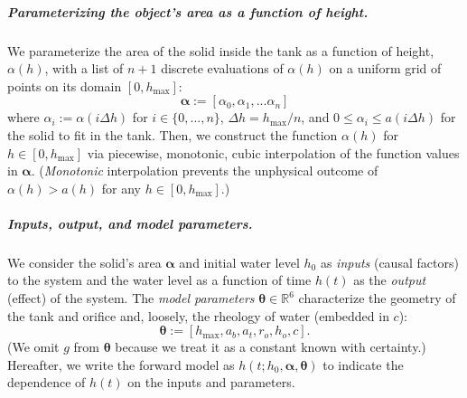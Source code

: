 \documentclass[openacc]{rsproca_new}%
\newcommand\themodel {$h(t; h_0, \boldsymbol \alpha, \boldsymbol\theta)$\xspace}
\begin{document}
\vspace{-\baselineskip}
\subparagraph{Parameterizing the object's area as a function of height.}
We parameterize the area of the solid inside the tank as a function of height, $\alpha(h)$, with a list of $n+1$ discrete evaluations of $\alpha(h)$ on a uniform grid of points on its domain $[0, h_{\text{max}}]$:
\begin{equation}
	\boldsymbol \alpha := [\alpha_0, \alpha_1, ... \alpha_n] \label{eq:alpha}
\end{equation}
where $\alpha_i :=\alpha(i \Delta h)$ for $i \in \{0, ..., n\}$, $\Delta h = h_{\text{max}}/n$, and $0 \leq \alpha_i \leq a(i\Delta h)$ for the solid to fit in the tank.
Then, we construct the function $\alpha(h)$ for $h\in [0, h_{\text{max}}]$ via piecewise, monotonic, cubic interpolation \cite{fritsch1984method} of the function values in $\boldsymbol \alpha$. (\emph{Monotonic} interpolation prevents the unphysical outcome of $\alpha(h) > a(h)$ for any $h \in [0, h_{\text{max}}]$.) 

\vspace{-\baselineskip}
\subparagraph{Inputs, output, and model parameters.} 
We
consider the solid's area $\boldsymbol \alpha$ and initial water level $h_0$ as \emph{inputs} (causal factors) to the system and the water level as a function of time $h(t)$ as the \emph{output} (effect) of the system.
The \emph{model parameters} $\boldsymbol \theta \in \mathbb{R}^6$ characterize the geometry of the tank and orifice and, loosely, the rheology of water (embedded in $c$):
\begin{equation}
	\boldsymbol \theta := [h_{\text{max}}, a_b, a_t, r_o, h_o, c]. \label{eq:theta}
\end{equation}
(We omit $g$ from $\boldsymbol \theta$ because we treat it as a constant known with certainty.)
Hereafter, we write the forward model as \themodel to indicate the dependence of $h(t)$ on the inputs and parameters.
\end{document}

